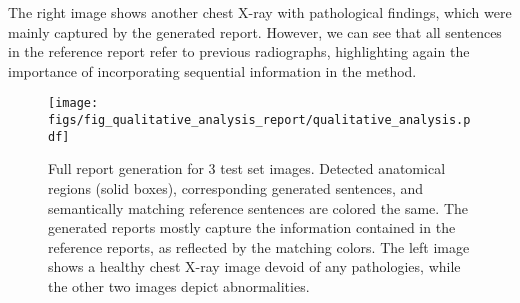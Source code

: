 \documentclass[10pt,twocolumn,letterpaper]{article}
\begin{document}
The right image shows another chest X-ray with pathological findings, which were mainly captured by the generated report. However, we can see that all sentences in the reference report refer to previous radiographs, highlighting again the importance of incorporating sequential information in the method.

\begin{figure*}[p]
  \centering
   \texttt{[image: figs/fig\_qualitative\_analysis\_report/qualitative\_analysis.pdf]}
   \caption{Full report generation for 3 test set images. Detected anatomical regions (solid boxes), corresponding generated sentences, and semantically matching reference sentences are colored the same. The generated reports mostly capture the information contained in the reference reports, as reflected by the matching colors. The left image shows a healthy chest X-ray image
devoid of any pathologies, while the other two images depict abnormalities.}
   \label{fig:qualitative_analysis_report}
\end{figure*}

\FloatBarrier

\onecolumn
\end{document}

